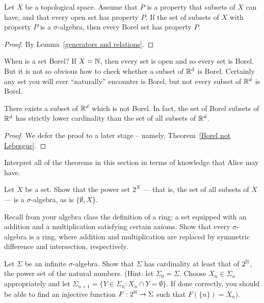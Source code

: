 \begin{lemma}
Let $X$ be a topological space.
Assume that $P$ is a property that subsets of $X$ can have, and that every open set has property $P$.
If the set of subsets of $X$ with property $P$ is a $\sigma$-algebra, then every Borel set has property $P$.
\end{lemma}
\begin{proof}
By Lemma~\ref{generators and relations}.
\end{proof}

\begin{subsec}
When is a set Borel? If $X = \mathbb{N}$, then every set is open and so every set is Borel.
But it is not so obvious how to check whether a subset of $\mathbb{R}^{d}$ is Borel.
Certainly any set you will ever ``naturally'' encounter is Borel, but not every subset of $\mathbb{R}^{d}$ is Borel.
\end{subsec}

\begin{theorem}\label{Borel sigma algebra}
There exists a subset of $\mathbb{R}^{d}$ which is not Borel.
In fact, the set of Borel subsets of $\mathbb{R}^{d}$ has strictly lower cardinality than the set of all subsets of $\mathbb{R}^{d}$.
\end{theorem}
\begin{proof}
We defer the proof to a later stage -- namely, Theorem~\ref{Borel not Lebesgue}.
\end{proof}

\begin{exercise}
Interpret all of the theorems in this section in terms of knowledge that Alice may have.
\end{exercise}

\begin{exercise}\label{trivial sigma algebras}
Let $X$ be a set.
Show that the power set $2^{X}$ --- that is, the set of all subsets of $X$ --- is a $\sigma$-algebra, as is $\{\emptyset, X\}$.
\end{exercise}

\begin{exercise}\label{sigma algebras are rings}
Recall from your algebra class the definition of a ring: a set equipped with an addition and a multiplication satisfying certain axioms.
Show that every $\sigma$-algebra is a ring, where addition and multiplication are replaced by symmetric difference and intersection, respectively.
\end{exercise}

\begin{exercise}
Let $\Sigma$ be an infinite $\sigma$-algebra. Show that $\Sigma$ has cardinality at least that of $2^{\mathbb{N}}$, the power set of the natural numbers.
(Hint: let $\Sigma_{0} = \Sigma$. Choose $X_{n} \in \Sigma_{n}$ appropriately and let $\Sigma_{n+1} = \{Y \in \Sigma_{n}: X_{n} \cap Y = \emptyset\}$. If done correctly, you should be able to find an injective function $F: 2^{\mathbb{N}} \to \Sigma$ such that $F(\{n\}) = X_{n}$).
\end{exercise}

